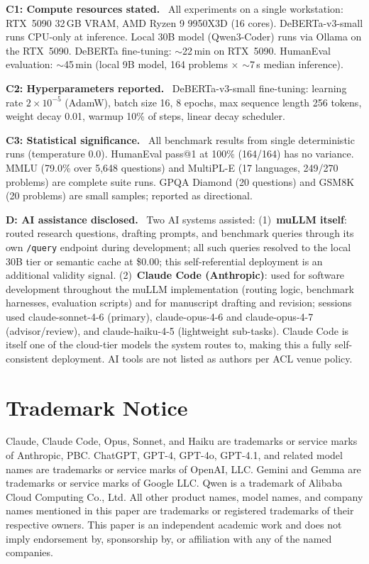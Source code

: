 \documentclass[11pt]{article}
\begin{document}
\textbf{C1: Compute resources stated.} \checkmark~All experiments on a
single workstation: RTX~5090 32\,GB VRAM, AMD Ryzen 9 9950X3D (16
cores). DeBERTa-v3-small runs CPU-only at inference. Local 30B model
(Qwen3-Coder) runs via Ollama on the RTX~5090. DeBERTa fine-tuning:
$\sim$22\,min on RTX~5090. HumanEval evaluation: $\sim$45\,min (local 9B
model, 164 problems $\times$ $\sim$7\,s median inference).

\textbf{C2: Hyperparameters reported.} \checkmark~DeBERTa-v3-small
fine-tuning: learning rate $2 \times 10^{-5}$ (AdamW), batch size 16,
8 epochs, max sequence length 256 tokens, weight decay 0.01, warmup
10\% of steps, linear decay scheduler.

\textbf{C3: Statistical significance.} \checkmark~All benchmark results
from single deterministic runs (temperature 0.0). HumanEval pass@1 at
100\% (164/164) has no variance. MMLU (79.0\% over 5,648 questions) and
MultiPL-E (17 languages, 249/270 problems) are complete suite runs.
GPQA Diamond (20 questions) and GSM8K (20 problems) are small samples;
reported as directional.

\textbf{D: AI assistance disclosed.} \checkmark~Two AI systems assisted:
(1)~\textbf{muLLM itself}: routed research questions, drafting prompts,
and benchmark queries through its own \texttt{/query} endpoint during
development; all such queries resolved to the local 30B tier or semantic
cache at \$0.00; this self-referential deployment is an additional
validity signal.
(2)~\textbf{Claude Code (Anthropic)}: used for software development
throughout the muLLM implementation (routing logic, benchmark harnesses,
evaluation scripts) and for manuscript drafting and revision; sessions
used claude-sonnet-4-6 (primary), claude-opus-4-6 and claude-opus-4-7
(advisor/review), and claude-haiku-4-5 (lightweight sub-tasks). Claude
Code is itself one of the cloud-tier models the system routes to, making
this a fully self-consistent deployment. AI tools are not listed as
authors per ACL venue policy.

\section*{Trademark Notice}

Claude, Claude Code, Opus, Sonnet, and Haiku are trademarks or service
marks of Anthropic, PBC\@. ChatGPT, GPT-4, GPT-4o, GPT-4.1, and related
model names are trademarks or service marks of OpenAI, LLC\@. Gemini and
Gemma are trademarks or service marks of Google LLC\@. Qwen is a
trademark of Alibaba Cloud Computing Co., Ltd. All other product names,
model names, and company names mentioned in this paper are trademarks or
registered trademarks of their respective owners. This paper is an
independent academic work and does not imply endorsement by, sponsorship
by, or affiliation with any of the named companies.
\end{document}

